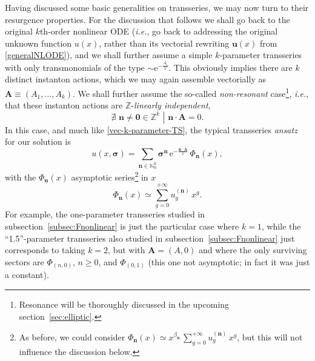 \documentclass[11pt,a4paper]{article}
\def\BN{{\mathbb N}}
\def\BZ{{\mathbb Z}}
\newcommand{\be}{\begin{equation}}
\newcommand{\ee}{\end{equation}}
\newcommand{\rme}{{\mathrm{e}}}
\begin{document}
Having discussed some basic generalities on transseries, we may now turn to their resurgence properties. For the discussion that follows we shall go back to the original $k$th-order nonlinear ODE (\textit{i.e.}, go back to addressing the original unknown function $u(x)$, rather than its vectorial rewriting $\boldsymbol{u} (x)$ from \eqref{generalNLODE}), and we shall further assume a simple $k$-parameter transseries with only transmonomials of the type $\sim \rme^{-\frac{A_i}{x}}$. This obviously implies there are $k$ distinct instanton actions, which we may again assemble vectorially as $\boldsymbol{A} \equiv \left( A_1, \ldots, A_k \right)$. We shall further assume the so-called \textit{non-resonant} case\footnote{Resonance will be thoroughly discussed in the upcoming section~\ref{sec:elliptic}.}, \textit{i.e.}, that these instanton actions are $\BZ$-\textit{linearly independent},
%
\be
\label{non-resonant-case}
\left. \nexists \,\, \boldsymbol{n} \neq \boldsymbol{0} \in \BZ^k \,\, \right| \,\, \boldsymbol{n} \cdot \boldsymbol{A} = 0.
\ee
%
\noindent
In this case, and much like \eqref{vec-k-parameter-TS}, the typical transseries \textit{ansatz} for our solution is
%
\be
\label{eq:sec5-transseries-vec}
u \left( x, \boldsymbol{\sigma} \right) = \sum_{\boldsymbol{n} \in \BN_0^k} \boldsymbol{\sigma}^{\boldsymbol{n}}\, \rme^{- \frac{\boldsymbol{n} \cdot \boldsymbol{A}}{x}}\, \Phi_{\boldsymbol{n}} (x),
\ee
%
\noindent
with the $\Phi_{\boldsymbol{n}} (x)$ asymptotic series\footnote{As before, we could consider $\Phi_{\boldsymbol{n}} (x) \simeq x^{\beta_{\boldsymbol{n}}}\, \sum_{g=0}^{+\infty} u_g^{(\boldsymbol{n})}\, x^g$, but this will not influence the discussion below.} in $x$
%
\begin{equation}
\label{eq:sec5-asympt-sectors-vec}
\Phi_{\boldsymbol{n}} (x) \simeq \sum_{g=0}^{+\infty} u_g^{(\boldsymbol{n})}\, x^g.
\end{equation}
%
\noindent
For example, the one-parameter transseries studied in subsection~\ref{subsec:Fnonlinear} is just the particular case where $k=1$, while the ``1.5''-parameter transseries also studied in subsection~\ref{subsec:Fnonlinear} just corresponds to taking $k=2$, but with $\boldsymbol{A}=(A,0)$ and where the only surviving sectors are $\Phi_{(n,0)}$, $n\ge0$, and $\Phi_{(0,1)}$ (this one not asymptotic; in fact it was just a constant).
\end{document}

